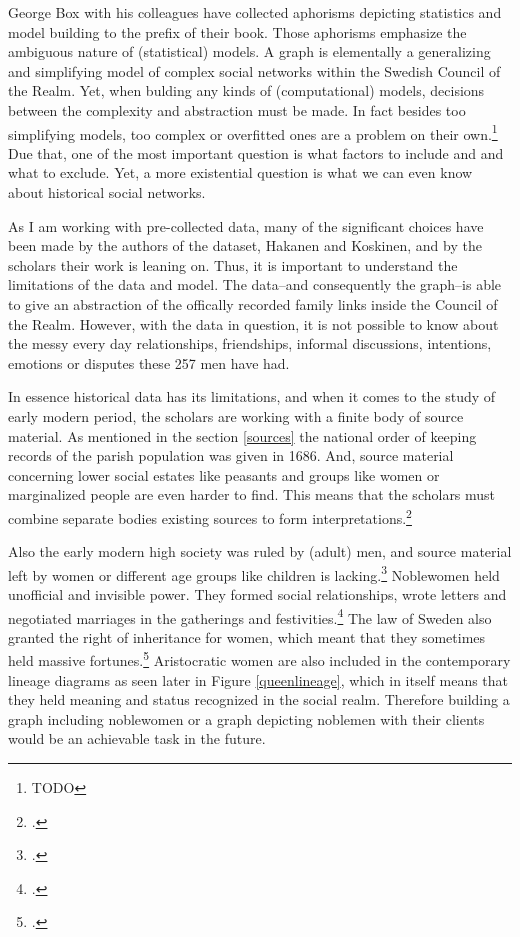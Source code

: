 George Box with his colleagues have collected aphorisms depicting statistics and model building to the prefix of their book. Those aphorisms emphasize the ambiguous nature of (statistical) models. A graph is elementally a generalizing and simplifying model of complex social networks within the Swedish Council of the Realm. Yet, when bulding any kinds of (computational) models, decisions between the complexity and abstraction must be made. In fact besides too simplifying models, too complex or overfitted ones are a problem on their own.\footnote{TODO} Due that, one of the most important question is what factors to include and and what to exclude. Yet, a more existential question is what we can even know about historical social networks. 

As I am working with pre-collected data, many of the significant choices have been made by the authors of the dataset, Hakanen and Koskinen, and by the scholars their work is leaning on. Thus, it is important to understand the limitations of the data and model. The data–and consequently the graph–is able to give an abstraction of the offically recorded family links inside the Council of the Realm. However, with the data in question, it is not possible to know about the messy every day relationships, friendships, informal discussions, intentions, emotions or disputes these 257 men have had. 

In essence historical data has its limitations, and when it comes to the study of early modern period, the scholars are working with a finite body of source material. As mentioned in the section \ref{sources} the national order of keeping records of the parish population was given in 1686. And, source material concerning lower social estates like peasants and groups like women or marginalized people are even harder to find. This means that the scholars must combine separate bodies existing sources to form interpretations.\footcite[p. 218.]{FagerlundA1999}

Also the early modern high society was ruled by (adult) men, and source material left by women or different age groups like children is lacking.\footcites[p. 158]{lappalainen06}[pp. 40-41.]{lappalainen06} Noblewomen held unofficial and invisible power. They formed social relationships, wrote letters and negotiated marriages in the gatherings and festivities.\footcites[pp. 140-142]{hakanenEtAll2020}[pp. 40-41.]{lappalainen06} The law of Sweden also granted the right of inheritance for women, which meant that they sometimes held massive fortunes.\footcites[p. 43]{lahtinen2020}[p. 40.]{lappalainen06} Aristocratic women are also included in the contemporary lineage diagrams as seen later in Figure \ref{queenlineage}, which in itself means that they held meaning and status recognized in the social realm. Therefore building a graph including noblewomen or a graph depicting noblemen with their clients would be an achievable task in the future.

